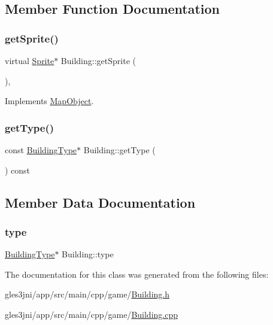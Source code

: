 \subsection{Member Function Documentation}
\mbox{\label{class_building_a2ae5faae2dec5d1fda5538ea08228c0d}} 
\subsubsection{\texorpdfstring{get\+Sprite()}{getSprite()}}
{\footnotesize\ttfamily virtual \hyperlink{class_sprite}{Sprite}$\ast$ Building\+::get\+Sprite (\begin{DoxyParamCaption}{ }\end{DoxyParamCaption})\hspace{0.3cm}{\ttfamily [inline]}, {\ttfamily [virtual]}}



Implements \hyperlink{class_map_object_a3881fea264291ba07e0172d1cd3246cc}{Map\+Object}.

\mbox{\label{class_building_a7e9f74497ce2598a9f2075284a723c9a}} 
\subsubsection{\texorpdfstring{get\+Type()}{getType()}}
{\footnotesize\ttfamily const \hyperlink{class_building_type}{Building\+Type}$\ast$ Building\+::get\+Type (\begin{DoxyParamCaption}{ }\end{DoxyParamCaption}) const\hspace{0.3cm}{\ttfamily [inline]}}



\subsection{Member Data Documentation}
\mbox{\label{class_building_a523cec1e5e46e521a0f202ffb20f2b62}} 
\subsubsection{\texorpdfstring{type}{type}}
{\footnotesize\ttfamily \hyperlink{class_building_type}{Building\+Type}$\ast$ Building\+::type\hspace{0.3cm}{\ttfamily [private]}}



The documentation for this class was generated from the following files\+:\begin{DoxyCompactItemize}
\item 
gles3jni/app/src/main/cpp/game/\hyperlink{_building_8h}{Building.\+h}\item 
gles3jni/app/src/main/cpp/game/\hyperlink{_building_8cpp}{Building.\+cpp}\end{DoxyCompactItemize}
